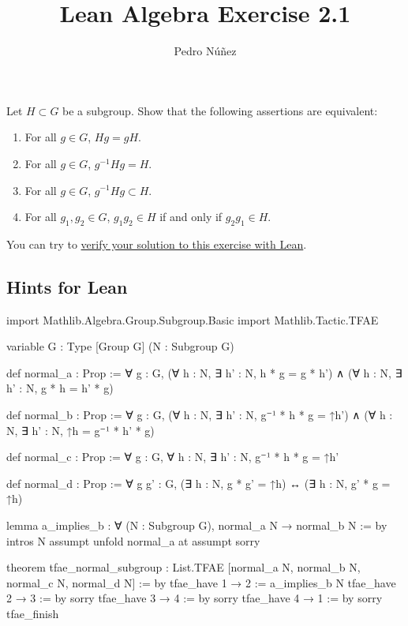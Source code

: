 \documentclass[12pt, a4paper]{article}
\title{Lean Algebra Exercise 2.1}
\author{Pedro N\'{u}\~{n}ez}
\theoremstyle{definition}
\newenvironment{xca}[1] {\renewcommand\theinnercustomthm{#1}\innercustomthm}
  {\endinnercustomthm}
\begin{document}
\begin{xca}{2.1}
  Let $H \subset G$ be a subgroup.
  Show that the following assertions are equivalent:
  \begin{enumerate}[label=(\alph*)]
    \item For all $g \in G$, $Hg = gH$.
    \item For all $g \in G$, $g^{-1}Hg = H$.
    \item For all $g \in G$, $g^{-1}Hg \subset H$.
    \item For all $g_{1}, g_{2} \in G$, $g_{1}g_{2} \in H$ if and only if $g_{2}g_{1} \in H$.
  \end{enumerate}

  You can try to \href{https://live.lean-lang.org/#codez=JYWwDg9gTgLgBAWQIYwBYBtgCMB0BBdAcwFMsokcBxKCAVzBwGVatCb6cAhJAZ2AGMAUKEixEKDNhwAVJPxgCZAMTwBRQYIBuSKMCRZ0xOAG9KcAFxxpATzDEAvnADa1OmDiUAunAAUAOQs4ZlZ2d0oASg0AE2IAMzgAO2gQJHQAfSQLQTg4AAUad3MAXjhAACI4QkDKABpfctRAv1rAYCI4VAByRtqGgCoKuBLKvo7wuEByImy6tq64Vo6ZoemS%2Bb7CSMEY%2BKSoFPSsLJz8iEKS8srLGqmGyybZts6b2sJAbwIATrhhj%2F6SwETCEfHJj56jM5g84Lc%2FgMKm8visKutNolkqk0vwDnkChZTv0LrVgY87vMCS93p9VlC%2Fu1onEkTsUVF0UcTmV%2BoQwZcfHMFl82RTUKNACmEvi5xM65N%2B%2FI0hhAKTgSDSIkwxB4aX25km5X8gWCbDcHnCtW2uwy4LggCTCWnG%2FYBYpwLDWSbABIwGg8U28Hi0cAwSa0BKxCDoBlGlGZFBynie72THjQKAOwRoYjQYggOAwWJIYhpEPpT0hPXqnIAGWAPBgyjUzlzJtuNethuR6TRdabaQZfm8tvtkwzWbSqCQmiMAEZzXAAExYuUK8BKlXW3uZ7OD4eT8cAZmnPZyOVjUHjS%2F7q6MW4tABZtw7d3B94ecn2V0OjJeLWPu9fd3fP4%2B0rEnWWqBAA}{verify your solution to this exercise with Lean}.
\end{xca}

\subsection*{Hints for Lean}

\begin{leancode}
  import Mathlib.Algebra.Group.Subgroup.Basic
  import Mathlib.Tactic.TFAE

  variable {G : Type} [Group G] (N : Subgroup G)

  def normal_a :
    Prop := ∀ g : G, (∀ h : N, ∃ h' : N, h * g = g * h') ∧
    (∀ h : N, ∃ h' : N, g * h = h' * g)

  def normal_b :
    Prop := ∀ g : G, (∀ h : N, ∃ h' : N, g⁻¹ * h * g = ↑h') ∧
    (∀ h : N, ∃ h' : N, ↑h = g⁻¹ * h' * g)

  def normal_c :
    Prop := ∀ g : G, ∀ h : N, ∃ h' : N, g⁻¹ * h * g = ↑h'

  def normal_d :
    Prop := ∀ g g' : G, (∃ h : N, g * g' = ↑h) ↔ (∃ h : N, g' * g = ↑h)

  lemma a_implies_b :
    ∀ (N : Subgroup G), normal_a N → normal_b N := by
    intros N assumpt
    unfold normal_a at assumpt
    sorry

  theorem tfae_normal_subgroup :
    List.TFAE [normal_a N, normal_b N, normal_c N, normal_d N] := by
    tfae_have 1 → 2 := a_implies_b N
    tfae_have 2 → 3 := by
      sorry
    tfae_have 3 → 4 := by
      sorry
    tfae_have 4 → 1 := by
      sorry
    tfae_finish
\end{leancode}
\end{document}
